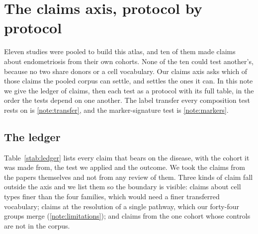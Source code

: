 %
%

\section{The claims axis, protocol by protocol}
\label{note:claims}

Eleven studies were pooled to build this atlas, and ten of them made claims
about endometriosis from their own cohorts. None of the ten could test
another's, because no two share donors or a cell vocabulary. Our claims
axis asks which of those claims the pooled corpus can settle, and settles
the ones it can. In this note we give the ledger of claims, then each test
as a protocol with its full table, in the order the tests depend on one
another. The label transfer every composition test rests on is
\ref{note:transfer}, and the marker-signature test is
\ref{note:markers}.

\subsection{The ledger}

Table~\ref{stab:ledger} lists every claim that bears on the disease, with
the cohort it was made from, the test we applied and the outcome. We took
the claims from the papers themselves and not from any review of them.
Three kinds of claim fall outside the axis and we list them so the boundary
is visible: claims about cell types finer than the four families, which
would need a finer transferred vocabulary; claims at the resolution of a
single pathway, which our forty-four groups merge
(\ref{note:limitations}); and claims from the one cohort
whose controls are not in the corpus.

